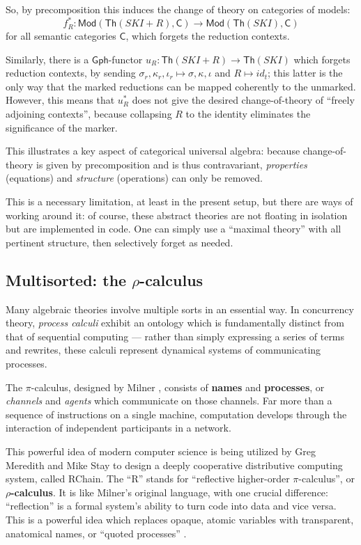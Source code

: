 \documentclass{amsart}
\theoremstyle{definition}
\newcommand{\Th}{\mathsf{Th}}
\newcommand{\Gph}{\mathsf{Gph}}
\newcommand{\Mod}{\mathsf{Mod}}
\newcommand{\C}{\mathsf{C}}
\newcommand{\maps}{\colon}
\begin{document}
So, by precomposition this induces the change of theory on categories of models: $$f_R^*\maps \Mod(\Th(SKI+R),\C) \to \Mod(\Th(SKI),\C)$$ for all semantic categories $\C$, which forgets the reduction contexts.

Similarly, there is a $\Gph$-functor $u_R\maps \Th(SKI+R)\to \Th(SKI)$ which forgets reduction contexts, by sending $\sigma_r,\kappa_r,\iota_r \mapsto\sigma, \kappa,\iota$ and $R \mapsto id_t$; this latter is the only way that the marked reductions can be mapped coherently to the unmarked. However, this means that $u_R^*$ does not give the desired change-of-theory of ``freely adjoining contexts'', because collapsing $R$ to the identity eliminates the significance of the marker.

This illustrates a key aspect of categorical universal algebra: because change-of-theory is given by precomposition and is thus contravariant, \textit{properties} (equations) and \textit{structure} (operations) can only be removed.

This is a necessary limitation, at least in the present setup, but there are ways of working around it: of course, these abstract theories are not floating in isolation but are implemented in code. One can simply use a ``maximal theory'' with all pertinent structure, then selectively forget as needed.

\subsection{Multisorted: the $\rho$-calculus}
\label{ssec:multisorted}

Many algebraic theories involve multiple sorts in an essential way. In concurrency theory, \textit{process calculi} exhibit an ontology which is fundamentally distinct from that of sequential computing --- rather than simply expressing a series of terms and rewrites, these calculi represent dynamical systems of communicating processes.

The $\pi$-calculus, designed by Milner \cite{milner}, consists of \textbf{names} and \textbf{processes}, or \textit{channels} and \textit{agents} which communicate on those channels. Far more than a sequence of instructions on a single machine, computation develops through the interaction of independent participants in a network.

This powerful idea of modern computer science is being utilized by Greg Meredith and Mike Stay to design a deeply cooperative distributive computing system, called RChain. The ``R'' stands for ``reflective higher-order $\pi$-calculus'', or \textbf{$\rho$-calculus}. It is like Milner's original language, with one crucial difference: ``reflection'' is a formal system's ability to turn code into data and vice versa. This is a powerful idea which replaces opaque, atomic variables with transparent, anatomical names, or ``quoted processes'' \cite{refl}.
\end{document}
